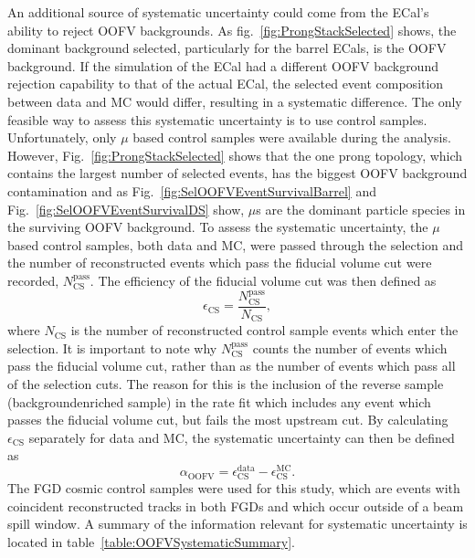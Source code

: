 \newline
\newline
An additional source of systematic uncertainty could come from the ECal's ability to reject OOFV backgrounds. As fig.~\ref{fig:ProngStackSelected} shows, the dominant background selected, particularly for the barrel ECals, is the OOFV background.  If the simulation of the ECal had a different OOFV background rejection capability to that of the actual ECal, the selected event composition between data and MC would differ, resulting in a systematic difference.  The only feasible way to assess this systematic uncertainty is to use control samples.  Unfortunately, only $\mu$ based control samples were available during the analysis.  However, Fig.~\ref{fig:ProngStackSelected} shows that the one prong topology, which contains the largest number of selected events, has the biggest OOFV background contamination and as Fig.~\ref{fig:SelOOFVEventSurvivalBarrel} and Fig.~\ref{fig:SelOOFVEventSurvivalDS} show, $\mu$s are the dominant particle species in the surviving OOFV background.  To assess the systematic uncertainty, the $\mu$ based control samples, both data and MC, were passed through the selection and the number of reconstructed events which pass the fiducial volume cut were recorded, $N_{\textrm{CS}}^{\textrm{pass}}$.  The efficiency of the fiducial volume cut was then defined as
\begin{equation}
\epsilon_{\textrm{CS}} = \frac{N_{\textrm{CS}}^{\textrm{pass}}}{N_{\textrm{CS}}},
\label{eqn:OOFVCSEfficiency}
\end{equation}
where $N_{\textrm{CS}}$ is the number of reconstructed control sample events which enter the selection.  It is important to note why $N_{\textrm{CS}}^{\textrm{pass}}$ counts the number of events which pass the fiducial volume cut, rather than as the number of events which pass all of the selection cuts.  The reason for this is the inclusion of the reverse sample (backgroundenriched sample) in the rate fit which includes any event which passes the fiducial volume cut, but fails the most upstream cut.  By calculating $\epsilon_{\textrm{CS}}$ separately for data and MC, the systematic uncertainty can then be defined as
\begin{equation}
\alpha_{\textrm{OOFV}} = \epsilon_{\textrm{CS}}^{\textrm{data}} - \epsilon_{\textrm{CS}}^{\textrm{MC}}.
\label{eqn:OOFVSystematic}
\end{equation}
The FGD cosmic control samples were used for this study, which are events with coincident reconstructed tracks in both FGDs and which occur outside of a beam spill window.  A summary of the information relevant for systematic uncertainty is located in table~\ref{table:OOFVSystematicSummary}.  
